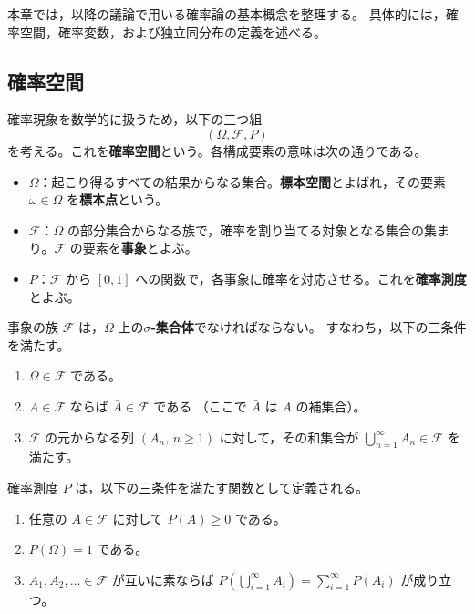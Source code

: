 \documentclass[a4j,dvipdfmx]{jsarticle}
\theoremstyle{plainnote}
\begin{document}
本章では，以降の議論で用いる確率論の基本概念を整理する。
具体的には，確率空間，確率変数，および独立同分布の定義を述べる。

\subsection{確率空間}

確率現象を数学的に扱うため，以下の三つ組
\[
  (\Omega,\mathcal{F},P)
\]
を考える。これを\textbf{確率空間}という。各構成要素の意味は次の通りである。

\begin{itemize}
  \item $\Omega$：起こり得るすべての結果からなる集合。\textbf{標本空間}とよばれ，その要素 $\omega \in \Omega$ を\textbf{標本点}という。
  \item $\mathcal{F}$：$\Omega$ の部分集合からなる族で，確率を割り当てる対象となる集合の集まり。$\mathcal{F}$ の要素を\textbf{事象}とよぶ。
  \item $P$：$\mathcal{F}$ から $[0,1]$ への関数で，各事象に確率を対応させる。これを\textbf{確率測度}とよぶ。
\end{itemize}

事象の族 $\mathcal{F}$ は，$\Omega$ 上の\textbf{$\sigma$-集合体}でなければならない。
すなわち，以下の三条件を満たす。
\begin{enumerate}
  \item $\Omega\in\mathcal{F}$ である。
  \item $A\in\mathcal{F}$ ならば $\bar{A}\in\mathcal{F}$ である
        （ここで $\bar{A}$ は $A$ の補集合）。
  \item $\mathcal{F}$ の元からなる列 $(A_n,\,n\geq 1)$ に対して，その和集合が
        $\displaystyle\bigcup_{n=1}^{\infty}A_n\in\mathcal{F}$ を満たす。
\end{enumerate}

確率測度 $P$ は，以下の三条件を満たす関数として定義される。
\begin{enumerate}
  \item 任意の $A\in\mathcal{F}$ に対して $P(A)\geq 0$ である。
  \item $P(\Omega)=1$ である。
  \item $A_1,A_2,\ldots \in \mathcal{F}$ が互いに素ならば
        $\displaystyle P\!\left(\bigcup_{i=1}^{\infty} A_i\right)
        =\sum_{i=1}^{\infty}P(A_i)$ が成り立つ。
\end{enumerate}
\end{document}
